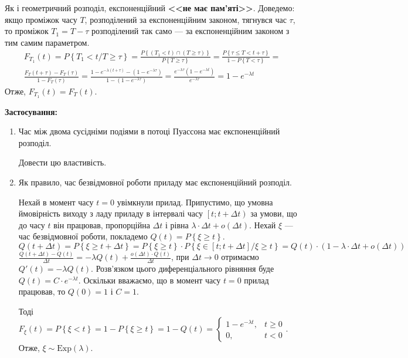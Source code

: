 Як і геометричний розподіл, експоненційний \textbf{<<не має пам'яті>>}.
Доведемо: якщо проміжок часу $T$, розподілений за експоненційним законом,
тягнувся час $\tau$, то проміжок $T_1 = T - \tau$ розподілений так само --- 
за експоненційним законом з тим самим параметром.
\begin{gather*}
    F_{T_1}(t) = P\left\{T_1 < t / T \geq \tau\right\} = 
    \frac{P\left\{(T_1 < t) \cap (T \geq \tau)\right\}}{P\left\{ T \geq \tau \right\}} =
    \frac{P{\left\{\tau \leq T < t +\tau\right\}}}{1 - P\left\{ T < \tau \right\}} = \\
    \frac{F_T(t+\tau) - F_T(\tau)}{1-F_T(\tau)} = 
    \frac{1-e^{-\lambda (t+\tau)} - (1 - e^{-\lambda \tau})}{1-(1-e^{-\lambda \tau})} =
    \frac{e^{-\lambda \tau}(1-e^{-\lambda t})}{e^{-\lambda \tau}} = 1-e^{-\lambda t}
\end{gather*}
Отже, $F_{T_1}(t) = F_T(t)$.

\noindent\textbf{Застосування:}
\begin{enumerate}
    \item Час між двома сусідніми подіями в потоці Пуассона має експоненційний розподіл.
    \begin{exercise}
        Довести цю властивість.
    \end{exercise}
    \item Як правило, час безвідмовної роботи приладу має експоненційний розподіл.
    
    Нехай в момент часу $t=0$ увімкнули прилад. Припустимо, що умовна ймовірність виходу з ладу
    приладу в інтервалі часу $\left[ t; t+\Delta t\right)$ за умови, що до часу $t$ він працював,
    пропорційна $\Delta t$ і рівна $\lambda\cdot \Delta t + o(\Delta t)$. Нехай $\xi$ --- час безвідмовної роботи,
    покладемо $Q(t) = P\left\{\xi \geq t\right\}$.
    $Q(t+\Delta t) = P\left\{\xi \geq t + \Delta t\right\} = P\left\{\xi \geq t\right\} \cdot P\left\{\xi \in \left[t; t+\Delta t\right] / \xi \geq t\right\} = 
    Q(t) \cdot (1 - \lambda\cdot \Delta t + o(\Delta t))$
    $\frac{Q(t+\Delta t) - Q(t)}{\Delta t} = -\lambda Q(t) + \frac{o(\Delta t)\cdot Q(t)}{\Delta t}$,
    при $\Delta t \rightarrow 0$ отримаємо $Q'(t) = -\lambda Q(t)$.
    Розв'язком цього диференціального рівняння буде $Q(t) = C\cdot e^{-\lambda t}$.
    Оскільки вважаємо, що в момент часу $t=0$ прилад працював, то $Q(0) = 1$ і $C=1$.

    Тоді $F_\xi(t) = P\left\{ \xi < t\right\} = 1 - P\left\{ \xi \geq t\right\} = 1 - Q(t) = \begin{cases}
        1 - e^{-\lambda t}, & t \geq 0 \\
        0, & t < 0
    \end{cases}$. Отже, $\xi \sim \mathrm{Exp}(\lambda)$.
\end{enumerate}

